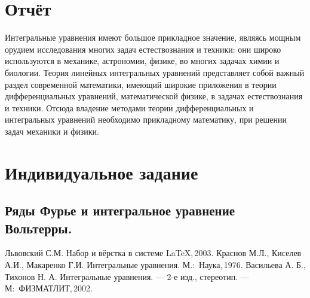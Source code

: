\documentclass{article}
\begin{document}
\newpage
\section{Отчёт}
Интегральные уравнения имеют большое прикладное значение, являясь мощным
орудием исследования многих задач естествознания и техники: они широко используются
в механике, астрономии, физике, во многих задачах химии и биологии. Теория линейных
интегральных уравнений представляет собой важный раздел современной математики,
имеющий широкие приложения в теории дифференциальных уравнений, математической
физике, в задачах естествознания и техники. Отсюда владение методами теории
дифференциальных и интегральных уравнений необходимо прикладному математику, при решении задач
механики и физики.

\newpage
\section{Индивидуальное задание}

\subsection{Ряды Фурье и интегральное уравнение Вольтерры.}




\newpage
{}
\begin{thebibliography}{99}
 Львовский С.М. Набор и вёрстка в системе \LaTeX,\,2003.
 Краснов М.Л., Киселев А.И., Макаренко Г.И. Интегральные уравнения. М.:~Наука,\,1976.
 Васильева А. Б., Тихонов Н. А. Интегральные уравнения. --- 2-е изд., стереотип. --- М:~ФИЗМАТЛИТ,\,2002.
\end{thebibliography}
\end{document}
